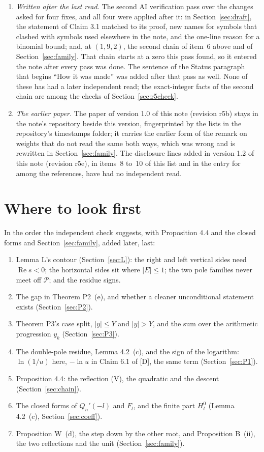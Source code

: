 \documentclass[11pt]{article}
\newcommand{\re}{\operatorname{Re}}
\begin{document}
\begin{enumerate}
\item \emph{Written after the last read.} The second AI verification pass over the changes asked for four fixes, and all four were applied after it: in Section~\ref{sec:draft}, the statement of Claim 3.1 matched to its proof, new names for symbols that clashed with symbols used elsewhere in the note, and the one-line reason for a binomial bound; and, at $(1,9,2)$, the second chain of item~6 above and of Section~\ref{sec:family}. That chain starts at a zero this pass found, so it entered the note after every pass was done. The sentence of the Status paragraph that begins ``How it was made'' was added after that pass as well. None of these has had a later independent read; the exact-integer facts of the second chain are among the checks of Section~\ref{sec:r5check}.
\item \emph{The earlier paper.} The paper of version 1.0 of this note (revision r5b) stays in the note's repository beside this version, fingerprinted by the lists in the repository's timestamps folder; it carries the earlier form of the remark on weights that do not read the same both ways, which was wrong and is rewritten in Section~\ref{sec:family}. The disclosure lines added in version 1.2 of this note (revision r5e), in items~8 to~10 of this list and in the entry for \cite{UN} among the references, have had no independent read.
\end{enumerate}

\section{Where to look first}\label{sec:look}

In the order the independent check suggests, with Proposition 4.4 and the closed forms and Section~\ref{sec:family}, added later, last:
\begin{enumerate}
\item Lemma L's contour (Section~\ref{sec:L}): the right and left vertical sides need $\re s<0$; the horizontal sides sit where $|E|\le1$; the two pole families never meet off $\mathcal{P}$; and the residue signs.
\item The gap in Theorem P2~(e), and whether a cleaner unconditional statement exists (Section~\ref{sec:P2}).
\item Theorem P3's case split, $|y|\le Y$ and $|y|>Y$, and the sum over the arithmetic progression $y_k$ (Section~\ref{sec:P3}).
\item The double-pole residue, Lemma 4.2~(c), and the sign of the logarithm: $\ln(1/u)$ here, $-\ln u$ in Claim 6.1 of [D], the same term (Section~\ref{sec:P1}).
\item Proposition 4.4: the reflection (V), the quadratic and the descent (Section~\ref{sec:chain}).
\item The closed forms of $Q_n'(-l)$ and $F_l$, and the finite part $H^0_l$ (Lemma 4.2~(c), Section~\ref{sec:coeff}).
\item Proposition W~(d), the step down by the other root, and Proposition B~(ii), the two reflections and the unit (Section~\ref{sec:family}).
\end{enumerate}
\end{document}
